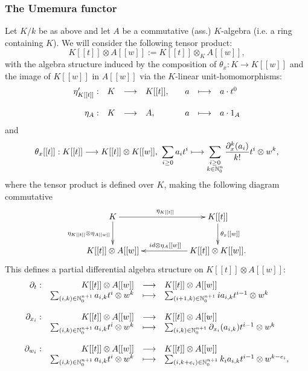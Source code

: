 \subsubsection{The Umemura functor}
Let $K/k$ be as above and let $A$ be a commutative (ass.) $K$-algebra (i.e. a ring containing $K$). We will consider the following tensor product:
$$K[[t]] \otimes A[[w]] := K[[t]] \otimes_K A[[w]],$$
with the algebra structure induced by the composition of $\theta_x : K \longrightarrow K[[w]]$ and the image of $K[[w]]$ in $A[[w]]$ via the $K$-linear unit-homomorphisms:
$$\bao{rrclcrcl}                
\eta_{K[[t]]}': &K &\longrightarrow& K[[t]],&& a &\longmapsto& a\cdot t^0\\
&&&&&&&\\
\eta_A : &K &\longrightarrow& A,&& a &\longmapsto& a\cdot 1_A\\
\ea$$
and
$$\theta_x[[t]] : K[[t]] \longrightarrow K[[t]] \otimes K[[w]],\ \sum_{i\geq0} a_i t^i \longmapsto \sum_{\substack{i\geq0\\k \in \nz_0^n}} \frac{\partial_x^k(a_i)}{k!} t^i \otimes w^k,$$
where the tensor product is defined over $K$, making the following diagram commutative
$$\xymatrix{
K \ar[rr]^{\eta_{K[[t]]}} \ar[d]_{\eta_{K[[t]]} \otimes \eta_{A[[w]]}} && K[[t]]\ar[d]^{\theta_x[[w]]}\\
K[[t]] \otimes A[[w]] && K[[t]] \otimes K[[w]]\ar[ll]_{id \otimes \eta_{A}[[w]]}.\\
}$$
This defines a partial differential algebra structure on $K[[t]] \otimes A[[w]]$:
$$\bao{rrcl}                                    
\partial_t :& K[[t]]\otimes A[[w]] &\longrightarrow& K[[t]]\otimes A[[w]]\\
& \sum_{(i,k) \in \nz_0^{n+1}} a_{i,k} t^i\otimes w^k&\longmapsto& \sum_{(i+1,k) \in \nz_0^{n+1}} i a_{i,k} t^{i-1} \otimes w^k\\
&&&\\
\partial_{x_i} :& K[[t]]\otimes A[[w]] &\longrightarrow& K[[t]]\otimes A[[w]]\\
& \sum_{(i,k) \in \nz_0^{n+1}} a_{i,k} t^i\otimes w^k&\longmapsto& \sum_{(i,k) \in \nz_0^{n+1}} \partial_{x_i}(a_{i,k}) t^{i-1} \otimes w^k\\
&&&\\
\partial_{w_i} :& K[[t]]\otimes A[[w]] &\longrightarrow& K[[t]]\otimes A[[w]]\\
& \sum_{(i,k) \in \nz_0^{n+1}} a_{i,k} t^i\otimes w^k&\longmapsto& \sum_{(i,k+e_i) \in \nz_0^{n+1}} k_i a_{i,k} t^{i-1} \otimes w^{k-e_i},\\
\ea$$
